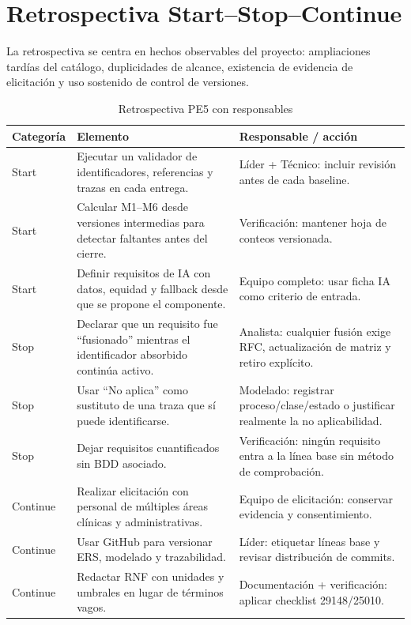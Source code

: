 \documentclass[11pt,a4paper]{article}
\begin{document}
	\section{Retrospectiva Start--Stop--Continue}
	La retrospectiva se centra en hechos observables del proyecto: ampliaciones tardías del catálogo, duplicidades de alcance, existencia de evidencia de elicitación y uso sostenido de control de versiones.
	\begin{longtable}{p{2.2cm}p{8cm}p{5.5cm}}
		\caption{Retrospectiva PE5 con responsables}\label{tab:retro}\\\toprule\textbf{Categoría}&\textbf{Elemento}&\textbf{Responsable / acción}\\\midrule\endhead
		Start&Ejecutar un validador de identificadores, referencias y trazas en cada entrega.&Líder + Técnico: incluir revisión antes de cada baseline.\\
		Start&Calcular M1--M6 desde versiones intermedias para detectar faltantes antes del cierre.&Verificación: mantener hoja de conteos versionada.\\
		Start&Definir requisitos de IA con datos, equidad y fallback desde que se propone el componente.&Equipo completo: usar ficha IA como criterio de entrada.\\
		Stop&Declarar que un requisito fue ``fusionado'' mientras el identificador absorbido continúa activo.&Analista: cualquier fusión exige RFC, actualización de matriz y retiro explícito.\\
		Stop&Usar ``No aplica'' como sustituto de una traza que sí puede identificarse.&Modelado: registrar proceso/clase/estado o justificar realmente la no aplicabilidad.\\
		Stop&Dejar requisitos cuantificados sin BDD asociado.&Verificación: ningún requisito entra a la línea base sin método de comprobación.\\
		Continue&Realizar elicitación con personal de múltiples áreas clínicas y administrativas.&Equipo de elicitación: conservar evidencia y consentimiento.\\
		Continue&Usar GitHub para versionar ERS, modelado y trazabilidad.&Líder: etiquetar líneas base y revisar distribución de commits.\\
		Continue&Redactar RNF con unidades y umbrales en lugar de términos vagos.&Documentación + verificación: aplicar checklist 29148/25010.\\\bottomrule\end{longtable}
	\clearpage
\end{document}
